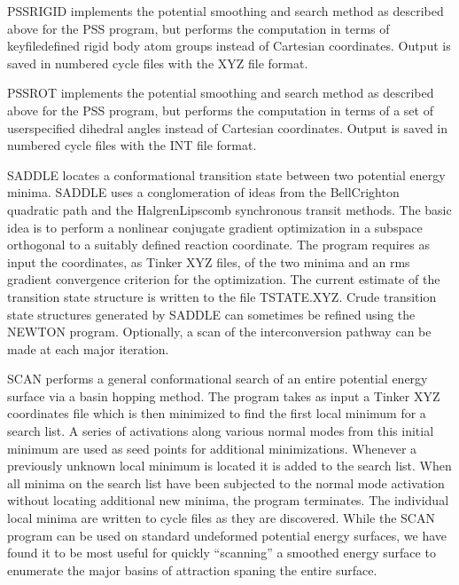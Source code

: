 \documentclass[letterpaper,11pt,english]{sphinxmanual}
\begin{document}
\sphinxAtStartPar
PSSRIGID implements the potential smoothing and search method as described above for the PSS program, but performs the computation in terms of keyfile\sphinxhyphen{}defined rigid body atom groups instead of Cartesian coordinates. Output is saved in numbered cycle files with the XYZ file format.

\sphinxAtStartPar
{}

\sphinxAtStartPar
PSSROT implements the potential smoothing and search method as described above for the PSS program, but performs the computation in terms of a set of user\sphinxhyphen{}specified dihedral angles instead of Cartesian coordinates. Output is saved in numbered cycle files with the INT file format.

\sphinxAtStartPar
{}

\sphinxAtStartPar
SADDLE locates a conformational transition state between two potential energy minima. SADDLE uses a conglomeration of ideas from the Bell\sphinxhyphen{}Crighton quadratic path and the Halgren\sphinxhyphen{}Lipscomb synchronous transit methods. The basic idea is to perform a nonlinear conjugate gradient optimization in a subspace orthogonal to a suitably defined reaction coordinate. The program requires as input the coordinates, as Tinker XYZ files, of the two minima and an rms gradient convergence criterion for the optimization. The current estimate of the transition state structure is written to the file TSTATE.XYZ. Crude transition state structures generated by SADDLE can sometimes be refined using the NEWTON program. Optionally, a scan of the interconversion pathway can be made at each major iteration.

\sphinxAtStartPar
{}

\sphinxAtStartPar
SCAN performs a general conformational search of an entire potential energy surface via a basin hopping method. The program takes as input a Tinker XYZ coordinates file which is then minimized to find the first local minimum for a search list. A series of activations along various normal modes from this initial minimum are used as seed points for additional minimizations. Whenever a previously unknown local minimum is located it is added to the search list. When all minima on the search list have been subjected to the normal mode activation without locating additional new minima, the program terminates. The individual local minima are written to cycle files as they are discovered. While the SCAN program can be used on standard undeformed potential energy surfaces, we have found it to be most useful for quickly “scanning” a smoothed energy surface to enumerate the major basins of attraction spaning the entire surface.
\end{document}
